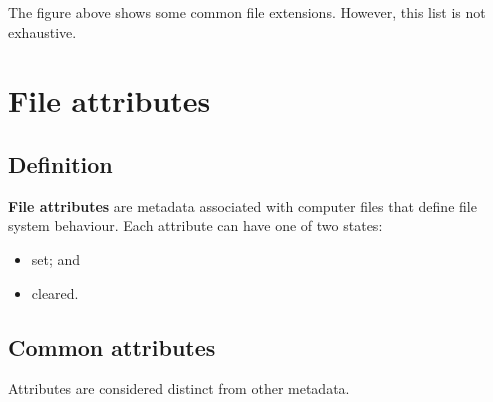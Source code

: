 \documentclass[a4paper]{systems-software}
\begin{document}
The figure above shows some common file extensions. However, this list is not exhaustive.


\section*{File attributes}

\subsection*{Definition}

\textbf{File attributes} are metadata associated with computer files that define file system behaviour. Each attribute can have one of two states:
\begin{itemize}
	\item set; and
	\item cleared.
\end{itemize}


\subsection*{Common attributes}

Attributes are considered distinct from other metadata.
\end{document}
